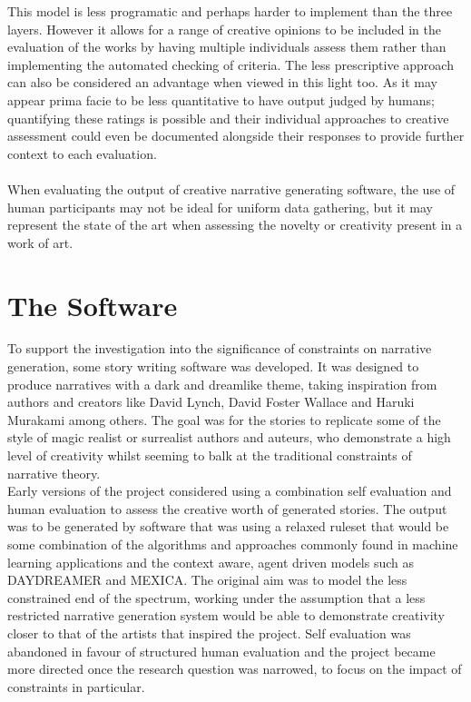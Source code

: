\documentclass[letterpaper]{article}
\begin{document}
This model is less programatic and perhaps harder to implement than the three layers. However it allows for a range of creative opinions to be included in the evaluation of the works by having multiple individuals assess them rather than implementing the automated checking of criteria. The less prescriptive approach can also be considered an advantage when viewed in this light too. As it may appear prima facie to be less quantitative to have output judged by humans; quantifying these ratings is possible and their individual approaches to creative assessment could even be documented alongside their responses to provide further context to each evaluation.\\
\\When evaluating the output of creative narrative generating software, the use of human participants may not be ideal for uniform data gathering,  but it may represent the state of the art when assessing the novelty or creativity present in a work of art.\\

\section{The Software}
To support the investigation into the significance of constraints on narrative generation, some story writing software was developed. 
It was designed to produce narratives with a dark and dreamlike theme, taking inspiration from authors and creators like David Lynch, David Foster Wallace and Haruki Murakami among others. The goal was for the stories to replicate some of the style of magic realist or surrealist authors and auteurs, who demonstrate a high level of creativity whilst seeming to balk at the traditional constraints of narrative theory. \\

Early versions of the project considered using a combination self evaluation and human evaluation to assess the creative worth of generated stories. The output was to be generated by software that was using a relaxed ruleset that would be some combination of the algorithms and approaches commonly found in machine learning applications and the context aware, agent driven models such as DAYDREAMER and MEXICA. The original aim was to model the less constrained end of the spectrum, working under the assumption that a less restricted narrative generation system would be able to demonstrate creativity closer to that of the artists that inspired the project. Self evaluation was abandoned in favour of structured human evaluation and the project became more directed once the research question was narrowed, to focus on the impact of constraints in particular.\\
\end{document}
